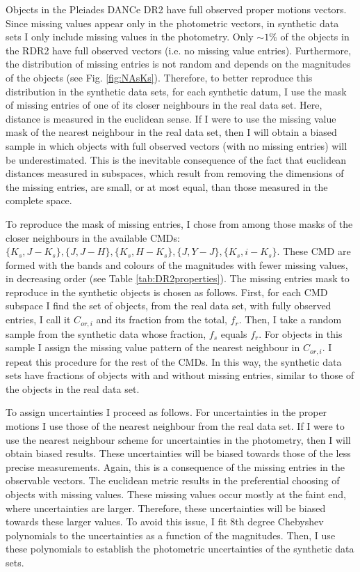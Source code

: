 Objects in the Pleiades DANCe DR2  have full observed proper motions vectors. Since missing values appear only in the photometric vectors, in synthetic data sets I only include missing values in the photometry. Only $\sim1\%$ of the objects in the RDR2 have full observed vectors (i.e. no missing value entries). Furthermore, the distribution of missing entries is not random and depends on the magnitudes of the objects (see Fig. \ref{fig:NAsKs}). Therefore, to better reproduce this distribution in the synthetic data sets, for each synthetic datum, I use the mask of missing entries of one of its closer neighbours in the real data set. Here, distance is measured in the euclidean sense. If I were to use the missing value mask of the nearest neighbour in the real data set, then I will obtain a biased sample in which objects with full observed vectors (with no missing entries) will be underestimated. This is the inevitable consequence of the fact that euclidean distances measured in subspaces, which result from removing the dimensions of the missing entries, are small, or at most equal, than those measured in the complete space. 

To reproduce the mask of missing entries, I chose from among those masks of the closer neighbours in the available CMDs: $\{K_s,J-K_s\},\{J,J-H\},\{K_s,H-K_s\},\{J,Y-J\},\{K_s,i-K_s\}$. These CMD are formed with the bands and colours of the magnitudes with fewer missing values, in decreasing order (see Table \ref{tab:DR2properties}).  The missing entries mask to reproduce in the synthetic objects is chosen as follows. First, for each CMD subspace I find the set of objects, from the real data set, with fully observed entries, I call it $C_{or,i}$ and its fraction from the total, $f_r$. Then, I take a random sample from the synthetic data whose fraction, $f_s$ equals $f_r$. For objects in this sample I assign the missing value pattern of the nearest neighbour in $C_{or,i}$. I repeat this procedure for the rest of the CMDs. In this way, the synthetic data sets have fractions of objects with and without missing entries, similar to those of the objects in the real data set.

To assign uncertainties I proceed as follows. For uncertainties in the proper motions I use those of the nearest neighbour from the real data set. If I were to use the nearest neighbour scheme for uncertainties in the photometry, then I will obtain biased results. These uncertainties will be biased towards those of the less precise measurements. Again, this is a consequence of the missing entries in the observable vectors. The euclidean metric results in the preferential choosing of objects with missing values. These missing values occur mostly at the faint end, where uncertainties are larger. Therefore, these uncertainties will be biased towards these larger values. To avoid this issue, I fit 8th degree Chebyshev polynomials to the uncertainties as a function of the magnitudes. Then, I use these polynomials to establish the photometric uncertainties of the synthetic data sets.

